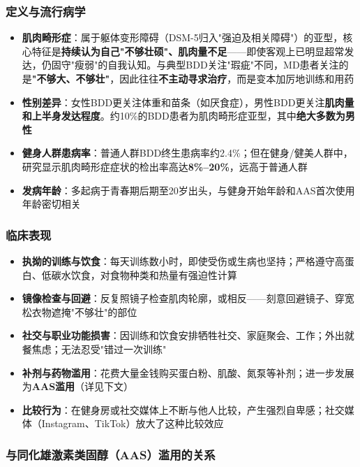 \begin{enumerate}
\subsubsection{定义与流行病学}

\begin{itemize}[leftmargin=2cm]
	\item \textbf{肌肉畸形症}：属于躯体变形障碍（DSM-5归入"强迫及相关障碍"）的亚型，核心特征是\textbf{持续认为自己"不够壮硕"、肌肉量不足}——即使客观上已明显超常发达，仍固守"瘦弱"的自我认知。与典型BDD关注"瑕疵"不同，MD患者关注的是\textbf{"不够大、不够壮"}，因此往往\textbf{不主动寻求治疗}，而是变本加厉地训练和用药
	\item \textbf{性别差异}：女性BDD更关注体重和苗条（如厌食症），男性BDD更关注\textbf{肌肉量和上半身发达程度}。约10\%的BDD患者为肌肉畸形症亚型，其中\textbf{绝大多数为男性}
	\item \textbf{健身人群患病率}：普通人群BDD终生患病率约2.4\%；但在健身/健美人群中，研究显示肌肉畸形症症状的检出率高达\textbf{8\%--20\%}，远高于普通人群
	\item \textbf{发病年龄}：多起病于青春期后期至20岁出头，与健身开始年龄和AAS首次使用年龄密切相关
\end{itemize}

\subsubsection{临床表现}

\begin{itemize}[leftmargin=2cm]
	\item \textbf{执拗的训练与饮食}：每天训练数小时，即使受伤或生病也坚持；严格遵守高蛋白、低碳水饮食，对食物种类和热量有强迫性计算
	\item \textbf{镜像检查与回避}：反复照镜子检查肌肉轮廓，或相反——刻意回避镜子、穿宽松衣物遮掩"不够壮"的部位
	\item \textbf{社交与职业功能损害}：因训练和饮食安排牺牲社交、家庭聚会、工作；外出就餐焦虑；无法忍受"错过一次训练"
	\item \textbf{补剂与药物滥用}：花费大量金钱购买蛋白粉、肌酸、氮泵等补剂；进一步发展为\textbf{AAS滥用}（详见下文）
	\item \textbf{比较行为}：在健身房或社交媒体上不断与他人比较，产生强烈自卑感；社交媒体（Instagram、TikTok）放大了这种比较效应
\end{itemize}

\subsubsection{与同化雄激素类固醇（AAS）滥用的关系}


\end{enumerate}
